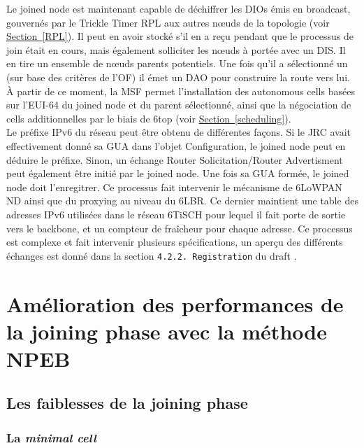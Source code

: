 \documentclass[]{report}
\newcommand{\wordlink}[2]{\hyperref[#2]{#1~\ref{#2}}}
\begin{document}
Le joined node est maintenant capable de déchiffrer les DIOs émis en broadcast, gouvernés par le Trickle Timer RPL aux autres nœuds de la topologie (voir \wordlink{Section}{RPL}). Il peut en avoir stocké s'il en a reçu pendant que le processus de join était en cours, mais également solliciter les nœuds à portée avec un DIS. Il en tire un ensemble de nœuds parents potentiels. Une fois qu'il a sélectionné un (sur base des critères de l'OF) il émet un DAO pour construire la route vers lui. À partir de ce moment, la MSF permet l'installation des autonomous cells basées sur l'EUI-64 du joined node et du parent sélectionné, ainsi que la négociation de cells additionnelles par le biais de 6top (voir \wordlink{Section}{scheduling}).\\

Le préfixe IPv6 du réseau peut être obtenu de différentes façons. Si le JRC avait effectivement donné sa GUA dans l'objet Configuration, le joined node peut en déduire le préfixe. Sinon, un échange Router Solicitation/Router Advertisment peut également être initié par le joined node. Une fois sa GUA formée, le joined node doit l'enregitrer. Ce processus fait intervenir le mécanisme de 6LoWPAN ND ainsi que du proxying au niveau du 6LBR. Ce dernier maintient une table des adresses IPv6 utilisées dans le réseau 6TiSCH pour lequel il fait porte de sortie vers le backbone, et un compteur de fraîcheur pour chaque adresse. Ce processus est complexe et fait intervenir plusieurs spécifications, un aperçu des différents échanges est donné dans la section \texttt{4.2.2.  Registration} du draft \cite{ietf-6tisch-architecture-28}.

\newpage

\chapter{Amélioration des performances de la joining phase avec la méthode NPEB}
\label{chap_NPEB}
\newpage

\section{Les faiblesses de la joining phase}
\label{prob_joining_phase}

\subsection{La \textit{minimal cell}}
\label{min_cell}
\end{document}
